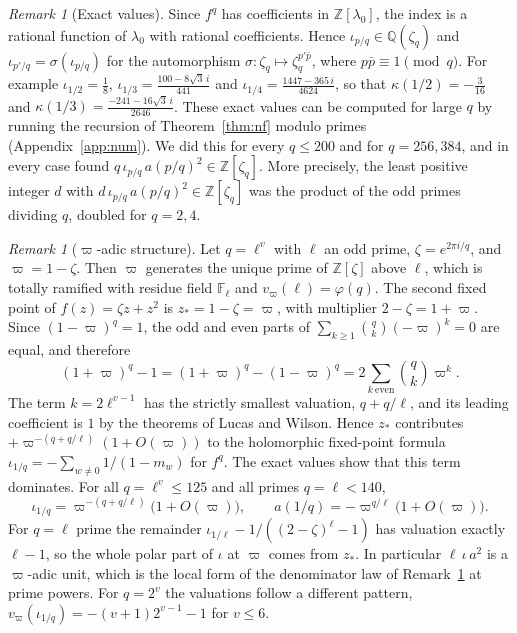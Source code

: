 \documentclass[11pt]{amsart}
\theoremstyle{definition}
\theoremstyle{remark}
\newtheorem{remark}[theorem]{Remark}
\newcommand{\Z}{\mathbb{Z}}
\newcommand{\Q}{\mathbb{Q}}
\begin{document}
\begin{remark}[Exact values]\label{rem:exact}
Since $f^q$ has coefficients in $\Z[\lambda_0]$, the index is a rational function of $\lambda_0$ with rational coefficients. Hence $\iota_{p/q}\in\Q(\zeta_q)$ and $\iota_{p'/q}=\sigma(\iota_{p/q})$ for the automorphism $\sigma:\zeta_q\mapsto\zeta_q^{p'\bar p}$, where $p\bar p\equiv1\pmod q$. For example $\iota_{1/2}=\frac18$, $\iota_{1/3}=\frac{100-8\sqrt3\,i}{441}$ and $\iota_{1/4}=\frac{1447-365\,i}{4624}$, so that $\kappa(1/2)=-\frac3{16}$ and $\kappa(1/3)=\frac{-241-16\sqrt3\,i}{2646}$. These exact values can be computed for large $q$ by running the recursion of Theorem~\ref{thm:nf} modulo primes (Appendix~\ref{app:num}). We did this for every $q\le200$ and for $q=256,384$, and in every case found $q\,\iota_{p/q}\,a(p/q)^2\in\Z[\zeta_q]$. More precisely, the least positive integer $d$ with $d\,\iota_{p/q}\,a(p/q)^2\in\Z[\zeta_q]$ was the product of the odd primes dividing $q$, doubled for $q=2,4$.
\end{remark}

\begin{remark}[$\varpi$-adic structure]\label{rem:padic}
Let $q=\ell^v$ with $\ell$ an odd prime, $\zeta=e^{2\pi i/q}$, and $\varpi=1-\zeta$. Then $\varpi$ generates the unique prime of $\Z[\zeta]$ above $\ell$, which is totally ramified with residue field $\mathbb F_\ell$ and $v_\varpi(\ell)=\varphi(q)$. The second fixed point of $f(z)=\zeta z+z^2$ is $z_*=1-\zeta=\varpi$, with multiplier $2-\zeta=1+\varpi$. Since $(1-\varpi)^q=1$, the odd and even parts of $\sum_{k\ge1}\binom qk(-\varpi)^k=0$ are equal, and therefore
\[
(1+\varpi)^q-1=(1+\varpi)^q-(1-\varpi)^q=2\sum_{k\ \mathrm{even}}\binom qk\varpi^k .
\]
The term $k=2\ell^{v-1}$ has the strictly smallest valuation, $q+q/\ell$, and its leading coefficient is $1$ by the theorems of Lucas and Wilson. Hence $z_*$ contributes $+\varpi^{-(q+q/\ell)}(1+O(\varpi))$ to the holomorphic fixed-point formula $\iota_{1/q}=-\sum_{w\ne0}1/(1-m_w)$ for $f^q$. The exact values show that this term dominates. For all $q=\ell^v\le125$ and all primes $q=\ell<140$,
\[
\iota_{1/q}=\varpi^{-(q+q/\ell)}\bigl(1+O(\varpi)\bigr),\qquad a(1/q)=-\varpi^{q/\ell}\bigl(1+O(\varpi)\bigr).
\]
For $q=\ell$ prime the remainder $\iota_{1/\ell}-1/((2-\zeta)^\ell-1)$ has valuation exactly $\ell-1$, so the whole polar part of $\iota$ at $\varpi$ comes from $z_*$. In particular $\ell\,\iota\,a^2$ is a $\varpi$-adic unit, which is the local form of the denominator law of Remark~\ref{rem:exact} at prime powers. For $q=2^v$ the valuations follow a different pattern, $v_\varpi(\iota_{1/q})=-(v+1)2^{v-1}-1$ for $v\le6$.
\end{remark}
\end{document}
